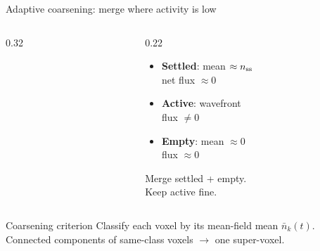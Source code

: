\documentclass[10pt,aspectratio=169]{beamer}
\begin{document}
\begin{frame}{Adaptive coarsening: merge where activity is low}
\begin{columns}[T]
\begin{column}{0.32\textwidth}
\end{column}
\begin{column}{0.22\textwidth}
  \vspace{0.5cm}
  \begin{itemize}\setlength\itemsep{0.5em}
    \item[\textcolor{settledblue}{\rule{0.7em}{0.7em}}]
      \textbf{Settled}: mean $\approx n_{\rm ss}$\\{\small net flux $\approx 0$}
    \item[\textcolor{activeorange}{\rule{0.7em}{0.7em}}]
      \textbf{Active}: wavefront\\{\small flux $\neq 0$}
    \item[\textcolor{emptygray}{\rule{0.7em}{0.7em}}]
      \textbf{Empty}: mean $\approx 0$\\{\small flux $\approx 0$}
  \end{itemize}
  \vspace{0.6em}
  {\small Merge settled + empty.\\Keep active fine.}
\end{column}
\end{columns}

\medskip
\begin{block}{Coarsening criterion}
  Classify each voxel by its mean-field mean $\bar n_k(t)$.
  Connected components of same-class voxels $\to$ one super-voxel.
\end{block}
\end{frame}
\end{document}
